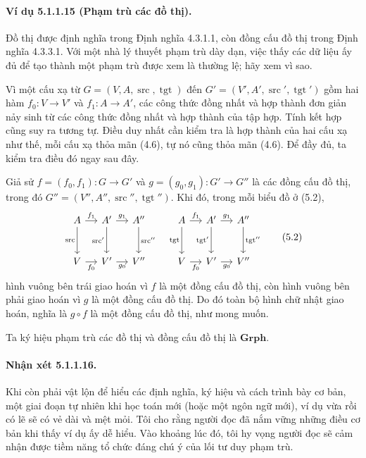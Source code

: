 \paragraph{Ví dụ 5.1.1.15 (Phạm trù các đồ thị).} Đồ thị được định nghĩa trong Định nghĩa 4.3.1.1, còn đồng cấu đồ thị trong Định nghĩa 4.3.3.1. Với một nhà lý thuyết phạm trù dày dạn, việc thấy các dữ liệu ấy đủ để tạo thành một phạm trù được xem là thường lệ; hãy xem vì sao.

Vì một cấu xạ từ $G=(V,A,\operatorname{src},\operatorname{tgt})$ đến $G'=(V',A',\operatorname{src}',\operatorname{tgt}')$ gồm hai hàm $f_0:V\to V'$ và $f_1:A\to A'$, các công thức đồng nhất và hợp thành đơn giản nảy sinh từ các công thức đồng nhất và hợp thành của tập hợp. Tính kết hợp cũng suy ra tương tự. Điều duy nhất cần kiểm tra là hợp thành của hai cấu xạ như thế, mỗi cấu xạ thỏa mãn (4.6), tự nó cũng thỏa mãn (4.6). Để đầy đủ, ta kiểm tra điều đó ngay sau đây.

Giả sử $f=(f_0,f_1):G\to G'$ và $g=(g_0,g_1):G'\to G''$ là các đồng cấu
đồ thị, trong đó $G''=(V'',A'',\operatorname{src}'',\operatorname{tgt}'')$. Khi đó, trong mỗi biểu đồ ở (5.2),
\begin{equation*}
\begin{tikzcd}[column sep=small,row sep=large]
A\arrow[r,"f_1"]\arrow[d,"\operatorname{src}"']&A'\arrow[r,"g_1"]\arrow[d,"\operatorname{src}'"']&A''\arrow[d,"\operatorname{src}''"]\\
V\arrow[r,"f_0"']&V'\arrow[r,"g_0"']&V''
\end{tikzcd}\quad
\begin{tikzcd}[column sep=small,row sep=large]
A\arrow[r,"f_1"]\arrow[d,"\operatorname{tgt}"']&A'\arrow[r,"g_1"]\arrow[d,"\operatorname{tgt}'"']&A''\arrow[d,"\operatorname{tgt}''"]\\
V\arrow[r,"f_0"']&V'\arrow[r,"g_0"']&V''
\end{tikzcd}\tag{5.2}
\end{equation*}
hình vuông bên trái giao hoán vì $f$ là một đồng cấu đồ thị, còn hình vuông bên phải giao hoán vì $g$ là một đồng cấu đồ thị. Do đó toàn bộ hình chữ nhật giao hoán, nghĩa là $g\circ f$ là một đồng cấu đồ thị, như mong muốn.

Ta ký hiệu phạm trù các đồ thị và đồng cấu đồ thị là $\mathbf{Grph}$.
\paragraph{Nhận xét 5.1.1.16.} Khi còn phải vật lộn để hiểu các định nghĩa, ký hiệu và cách trình bày cơ bản, một giai đoạn tự nhiên khi học toán mới (hoặc một ngôn ngữ mới), ví dụ vừa rồi có lẽ sẽ có vẻ dài và mệt mỏi. Tôi cho rằng người đọc đã nắm vững những điều cơ bản khi thấy ví dụ ấy dễ hiểu. Vào khoảng lúc đó, tôi hy vọng người đọc sẽ cảm nhận được tiềm năng tổ chức đáng chú ý của lối tư duy phạm trù.
